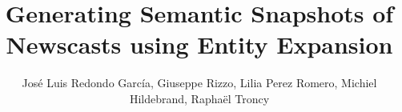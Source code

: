 \documentclass{llncs}
\begin{document}
\frontmatter          %
\pagestyle{headings}  %
\mainmatter              %

\title{Generating Semantic Snapshots of Newscasts using Entity Expansion}
\author{Jos\'e Luis Redondo Garc\'ia, Giuseppe Rizzo, Lilia Perez Romero, Michiel Hildebrand, Rapha\"el Troncy}

\maketitle              %

\end{document}
